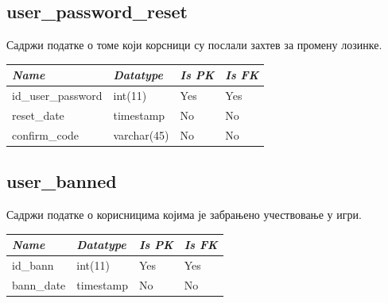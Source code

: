 \subsection{user\_password\_reset}
Садржи податке о томе који корсници су послали захтев за промену лозинке.

\begin{table}[h!]
\centering
\small

    \begin{tabular}{ | m{} | m{} | m{} | m{} | }
    \hline
        \cellcolor{blue!25}\textbf{\textit{Name}} &

        \cellcolor{blue!25}\textbf{\textit{Datatype}} &
        \cellcolor{blue!25}\textbf{\textit{Is PK}} &
        \cellcolor{blue!25}\textbf{\textit{Is FK}} \\
    \hline
    \hline
        id\_user\_password & int(11) & Yes & Yes \\
    \hline
        reset\_date & timestamp & No & No \\
    \hline
        confirm\_code & varchar(45) & No & No \\
    \hline
    \end{tabular}

\end{table}

\newpage

\subsection{user\_banned}
Садржи податке о корисницима којима је забрањено учествовање у игри.

\begin{table}[h!]
\centering
\small

    \begin{tabular}{ | m{} | m{} | m{} | m{} | }
    \hline
        \cellcolor{blue!25}\textbf{\textit{Name}} &

        \cellcolor{blue!25}\textbf{\textit{Datatype}} &
        \cellcolor{blue!25}\textbf{\textit{Is PK}} &
        \cellcolor{blue!25}\textbf{\textit{Is FK}} \\
    \hline
    \hline
        id\_bann & int(11) & Yes & Yes \\
    \hline
        bann\_date & timestamp & No & No \\
    \hline
    \end{tabular}

\end{table}


